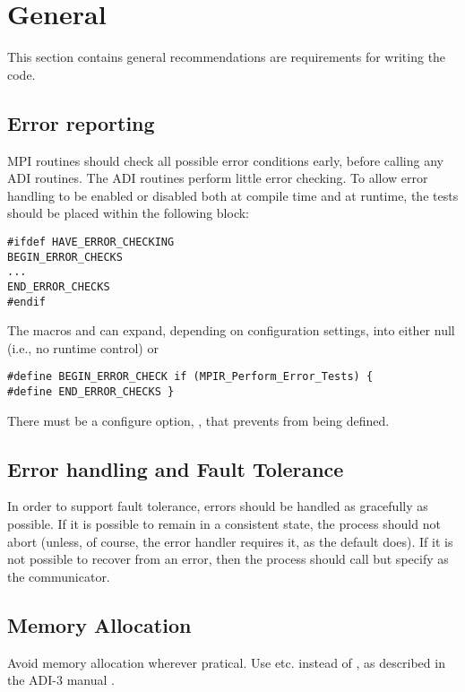 \documentclass{article}
\begin{document}
\section{General}
This section contains general recommendations are requirements for
writing the code.

\subsection{Error reporting}

MPI routines should check all possible error conditions early, before
calling any ADI routines.  The ADI routines perform little error
checking.  To allow error handling to be enabled or disabled both at compile
time 
and at runtime, the tests should be placed within the following block:
\begin{verbatim}
#ifdef HAVE_ERROR_CHECKING
BEGIN_ERROR_CHECKS
...
END_ERROR_CHECKS
#endif
\end{verbatim}
The macros  and  can
expand, depending on configuration settings, into either null (i.e.,
no runtime control) or 
\begin{verbatim}
#define BEGIN_ERROR_CHECK if (MPIR_Perform_Error_Tests) {
#define END_ERROR_CHECKS }
\end{verbatim}

There must be a configure option, ,
that prevents  from being defined.

\subsection{Error handling and Fault Tolerance}
In order to support fault tolerance, errors should be handled as
gracefully as possible.  If it is possible to remain in a consistent
state, the process should not abort (unless, of course, the error
handler requires it, as the default  does).  
If it is not possible to recover from an error, then the process
should call  but specify  as the
communicator.  

\subsection{Memory Allocation}
Avoid memory allocation wherever pratical.  Use 
etc. instead of , as described in the ADI-3 manual
\cite{adi3man}. 
\end{document}
